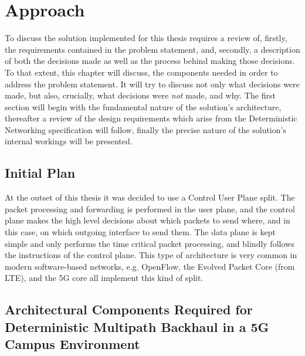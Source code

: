 
\cleardoublepage
\chapter{Approach}
\label{cha:approach}

To discuss the solution implemented for this thesis requires a review of, firstly, the requirements contained in the problem statement, and, secondly, a description of both the decisions made as well as the process behind making those decisions. To that extent, this chapter will discuss, the components needed in order to address the problem statement. It will try to discuss not only what decisions were made, but also, crucially, what decisions were \textit{not} made, and why. The first section will begin with the fundamental nature of the solution's architecture, thereafter a review of the design requirements which arise from the Deterministic Networking specification will follow, finally the precise nature of the solution's internal workings will be presented.

\section{Initial Plan}
\label{sec:approach:plan}

At the outset of this thesis it was decided to use a Control User Plane split. The packet processing and forwarding is performed in the user plane, and the control plane makes the high level decisions about which packets to send where, and in this case, on which outgoing interface to send them. The data plane is kept simple and only performs the time critical packet processing, and blindly follows the instructions of the control plane. This type of architecture is very common in modern software-based networks, e.g. OpenFlow, the Evolved Packet Core (from LTE), and the 5G core all implement this kind of split.

\section{Architectural Components Required for Deterministic Multipath Backhaul in a 5G Campus Environment}
\label{sec:approach:req}



